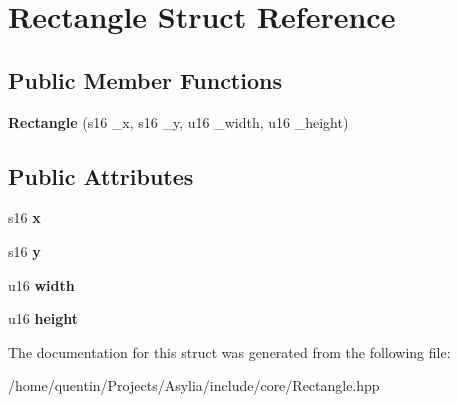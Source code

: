 \hypertarget{structRectangle}{\section{Rectangle Struct Reference}
\label{structRectangle}
}
\subsection*{Public Member Functions}
\begin{DoxyCompactItemize}
\item 
\hypertarget{structRectangle_a602bf07738bc080fcc4014232d5a52b5}{{\bfseries Rectangle} (s16 \-\_\-x, s16 \-\_\-y, u16 \-\_\-width, u16 \-\_\-height)}\label{structRectangle_a602bf07738bc080fcc4014232d5a52b5}

\end{DoxyCompactItemize}
\subsection*{Public Attributes}
\begin{DoxyCompactItemize}
\item 
\hypertarget{structRectangle_acfdfea445db55a8783bfce265bccd77c}{s16 {\bfseries x}}\label{structRectangle_acfdfea445db55a8783bfce265bccd77c}

\item 
\hypertarget{structRectangle_a04785954856a12078847ffda7ff52ec3}{s16 {\bfseries y}}\label{structRectangle_a04785954856a12078847ffda7ff52ec3}

\item 
\hypertarget{structRectangle_acb97cf4251b89c0e8fc5a749827f267a}{u16 {\bfseries width}}\label{structRectangle_acb97cf4251b89c0e8fc5a749827f267a}

\item 
\hypertarget{structRectangle_ace4a1f5cf716f05c1d6e42299c759d19}{u16 {\bfseries height}}\label{structRectangle_ace4a1f5cf716f05c1d6e42299c759d19}

\end{DoxyCompactItemize}


The documentation for this struct was generated from the following file\-:\begin{DoxyCompactItemize}
\item 
/home/quentin/\-Projects/\-Asylia/include/core/Rectangle.\-hpp\end{DoxyCompactItemize}
